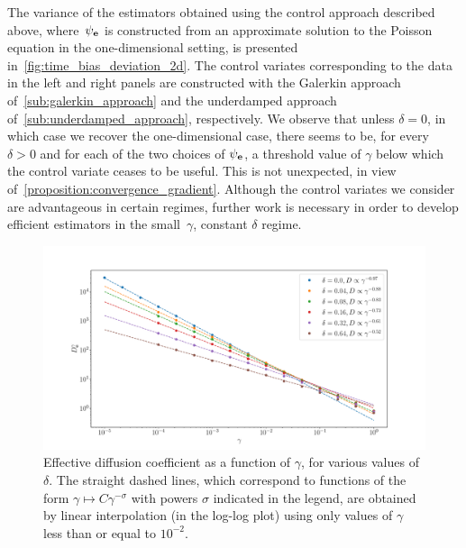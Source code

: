 \documentclass[11pt,a4paper]{article}
\begin{document}
The variance of the estimators obtained using the control approach described above,
where~$\psi_{\boldsymbol{\mathbf e}}$ is constructed from an approximate solution to the Poisson equation in the one-dimensional setting,
is presented in~\cref{fig:time_bias_deviation_2d}.
The control variates corresponding to the data in the left and right panels
are constructed with the Galerkin approach of~\cref{sub:galerkin_approach}
and the underdamped approach of~\cref{sub:underdamped_approach}, respectively.
We observe that unless $\delta = 0$, in which case we recover the one-dimensional case,
there seems to be, for every~$\delta > 0$ and for each of the two choices of $\psi_{\boldsymbol{\mathbf e}}$,
a threshold value of $\gamma$ below which the control variate ceases to be useful.
This is not unexpected, in view of~\cref{proposition:convergence_gradient}.
Although the control variates we consider are advantageous in certain regimes,
further work is necessary in order to develop efficient estimators in the small~$\gamma$, constant $\delta$ regime.

\begin{figure}[ht]
    \centering
    \includegraphics[width=0.99\linewidth]{figures/diffusion.pdf}
    \caption{
        Effective diffusion coefficient as a function of $\gamma$,
        for various values of $\delta$.
        The straight dashed lines, which correspond to functions of the form $\gamma \mapsto C \gamma^{-\sigma}$ with powers $\sigma$ indicated in the legend,
        are obtained by linear interpolation (in the log-log plot) using only values of $\gamma$ less than or equal to $10^{-2}$.
    }%
    \label{fig:time_bias_variance_2d}
\end{figure}
\end{document}
